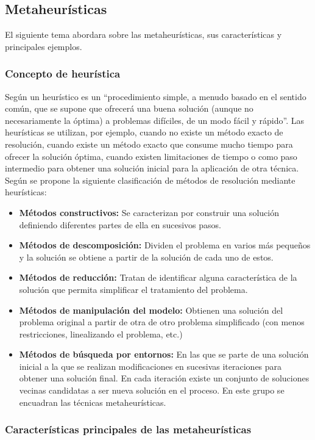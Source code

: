\subsection {Metaheurísticas}  
El siguiente tema abordara sobre las metaheurísticas, sus características y principales ejemplos.
\subsubsection {Concepto de heurística}  
Según \cite{[ZANAEVA]} un heurístico es un “procedimiento simple, a menudo basado en el sentido común, que se supone que ofrecerá una buena solución (aunque no necesariamente la óptima) a problemas difíciles, de un modo fácil y rápido”. Las heurísticas se utilizan, por ejemplo, cuando no existe un método exacto de resolución, cuando existe un método exacto que consume mucho tiempo para ofrecer la solución óptima, cuando existen limitaciones de tiempo o como paso intermedio para obtener una solución inicial para la aplicación de otra técnica. Según \cite {[SILVER]} se propone la siguiente clasificación de métodos de resolución mediante heurísticas:
\begin{itemize}
\item \textbf{Métodos constructivos: } Se caracterizan por construir una solución definiendo diferentes partes de ella en sucesivos pasos.
\item \textbf{Métodos de descomposición: } Dividen el problema en varios más pequeños y la solución se obtiene a partir de la solución de cada uno de estos.
\item \textbf{Métodos de reducción: } Tratan de identificar alguna característica de la solución que permita simplificar el tratamiento del problema.
\item \textbf{Métodos de manipulación del modelo: } Obtienen una solución del problema original a partir de otra de otro problema simplificado (con menos restricciones, linealizando el problema, etc.)
\item \textbf{Métodos de búsqueda por entornos: } En las que se parte de una solución inicial a la que se realizan modificaciones en sucesivas iteraciones para obtener una solución final. En cada iteración existe un conjunto de soluciones vecinas candidatas a ser nueva solución en el proceso. En este grupo se encuadran las técnicas metaheurísticas.
\end{itemize}

\subsubsection {Características principales de las metaheurísticas} 

